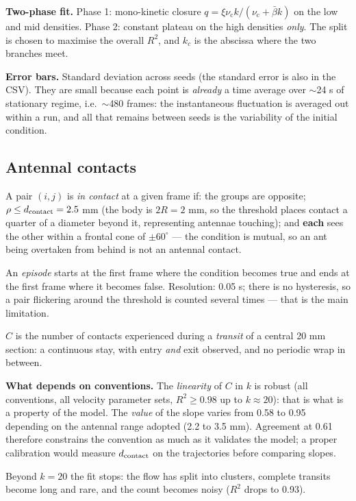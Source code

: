 \documentclass[11pt,a4paper]{article}
\newcommand{\cruise}{\mathrm{c}}
\begin{document}
\textbf{Two-phase fit.} Phase 1: mono-kinetic closure
$q=\xi\nu_\cruise k/(\nu_\cruise+\bar\beta k)$ on the low and mid densities.
Phase 2: constant plateau on the high densities \emph{only}. The split is chosen
to maximise the overall $R^2$, and $k_c$ is the abscissa where the two branches
meet.

\textbf{Error bars.} Standard deviation across seeds (the standard error is also
in the CSV). They are small because each point is \emph{already} a time average
over $\sim$24 s of stationary regime, i.e.\ $\sim$480 frames: the instantaneous
fluctuation is averaged out within a run, and all that remains between seeds is
the variability of the initial condition.

\subsection{Antennal contacts}

A pair $(i,j)$ is \emph{in contact} at a given frame if: the groups are
opposite; $\rho\leq d_{\rm contact}=2.5$ mm (the body is $2R=2$ mm, so the
threshold places contact a quarter of a diameter beyond it, representing
antennae touching); and \textbf{each} sees the other within a frontal cone of
$\pm60^\circ$ --- the condition is mutual, so an ant being overtaken from behind
is not an antennal contact.

An \emph{episode} starts at the first frame where the condition becomes true and
ends at the first frame where it becomes false. Resolution: 0.05 s; there is no
hysteresis, so a pair flickering around the threshold is counted several times
--- that is the main limitation.

$C$ is the number of contacts experienced during a \emph{transit} of a central
20 mm section: a continuous stay, with entry \emph{and} exit observed, and no
periodic wrap in between.

\textbf{What depends on conventions.} The \emph{linearity} of $C$ in $k$ is
robust (all conventions, all velocity parameter sets, $R^2\geq0.98$ up to
$k\approx20$): that is what is a property of the model. The \emph{value} of the
slope varies from 0.58 to 0.95 depending on the antennal range adopted (2.2 to
3.5 mm). Agreement at 0.61 therefore constrains the convention as much as it
validates the model; a proper calibration would measure $d_{\rm contact}$ on the
trajectories before comparing slopes.

Beyond $k=20$ the fit stops: the flow has split into clusters, complete transits
become long and rare, and the count becomes noisy ($R^2$ drops to 0.93).
\end{document}
